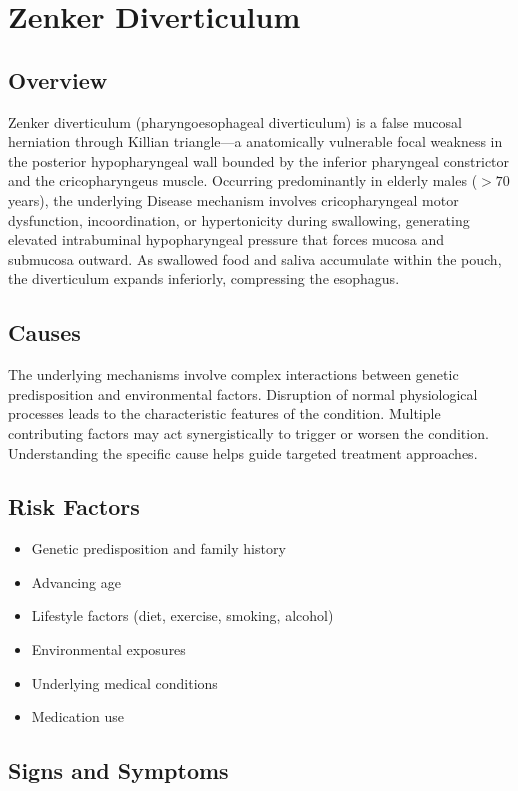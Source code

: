 \chapter{Zenker Diverticulum}
\label{sec:Zenker Diverticulum}

\section{Overview}
Zenker diverticulum (pharyngoesophageal diverticulum) is a false mucosal herniation through Killian triangle---a anatomically vulnerable focal weakness in the posterior hypopharyngeal wall bounded by the inferior pharyngeal constrictor and the cricopharyngeus muscle. Occurring predominantly in elderly males ($>70$ years), the underlying Disease mechanism involves cricopharyngeal motor dysfunction, incoordination, or hypertonicity during swallowing, generating elevated intrabuminal hypopharyngeal pressure that forces mucosa and submucosa outward. As swallowed food and saliva accumulate within the pouch, the diverticulum expands inferiorly, compressing the esophagus.
\section{Causes}
The underlying mechanisms involve complex interactions between genetic predisposition and environmental factors. Disruption of normal physiological processes leads to the characteristic features of the condition. Multiple contributing factors may act synergistically to trigger or worsen the condition. Understanding the specific cause helps guide targeted treatment approaches.
\section{Risk Factors}


\begin{itemize}[noitemsep]
  \item Genetic predisposition and family history
  \item Advancing age
  \item Lifestyle factors (diet, exercise, smoking, alcohol)
  \item Environmental exposures
  \item Underlying medical conditions
  \item Medication use
\end{itemize}
\section{Signs and Symptoms}

